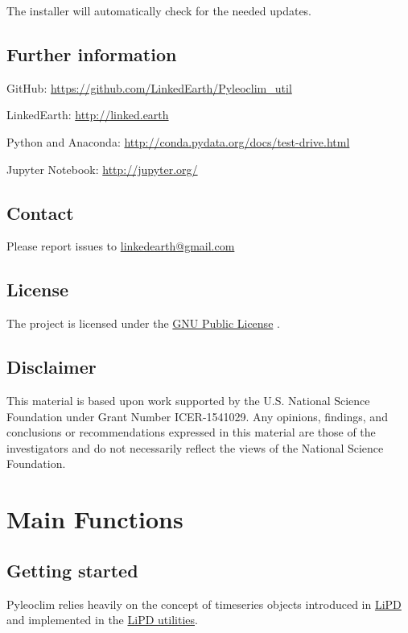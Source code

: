 \documentclass[letterpaper,10pt,english]{sphinxmanual}
\begin{document}
The installer will automatically check for the needed updates.


\section{Further information}
\label{Introduction:further-information}
\begin{DUlineblock}{0em}
\item[] GitHub: \href{https://github.com/LinkedEarth/Pyleoclim\_util}{https://github.com/LinkedEarth/Pyleoclim\_util}
\item[] LinkedEarth: \href{http://linked.earth}{http://linked.earth}
\item[] Python and Anaconda: \href{http://conda.pydata.org/docs/test-drive.html}{http://conda.pydata.org/docs/test-drive.html}
\item[] Jupyter Notebook: \href{http://jupyter.org/}{http://jupyter.org/}
\end{DUlineblock}


\section{Contact}
\label{Introduction:contact}
Please report issues to \href{mailto:linkedearth@gmail.com}{linkedearth@gmail.com}


\section{License}
\label{Introduction:license}
The project is licensed under the \href{https://github.com/LinkedEarth/Pyleoclim\_util/blob/master/license}{GNU Public License} .


\section{Disclaimer}
\label{Introduction:disclaimer}
This material is based upon work supported by the U.S. National Science Foundation under Grant Number
ICER-1541029. Any opinions, findings, and conclusions or recommendations expressed in this material are those
of the investigators and do not necessarily reflect the views of the National Science Foundation.


\chapter{Main Functions}
\label{Main::doc}\label{Main:main-functions}

\section{Getting started}
\label{Main:getting-started}
Pyleoclim relies heavily on the concept of timeseries objects introduced in
\href{http://www.clim-past.net/12/1093/2016/}{LiPD} and implemented in the
\href{http://nickmckay.github.io/LiPD-utilities/}{LiPD utilities}.
\end{document}
